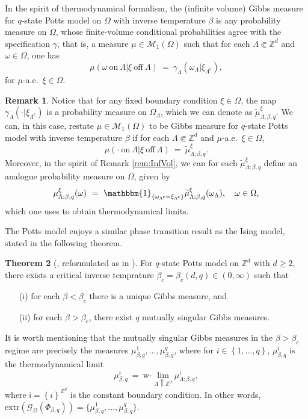 \documentclass[12pt]{article}
\newcommand{\G}{\mathcal{G}}
\newcommand{\M}{\mathcal{M}}
\newcommand{\Z}{\mathbb{Z}}
\newcommand{\set}[1]{\left\{#1\right\}}
\newcommand{\pika}{\boldsymbol{\cdot}}
\newcommand{\1}{\mathbbm{1}}
\renewcommand{\c}{\mathsf{c}}
\newcommand{\5}{\vspace{0.5cm}}
\renewcommand{\tilde}{\widetilde}
\theoremstyle{definition}
\newtheorem{thm}{Theorem}[section]
\newtheorem{rem}[thm]{Remark}
\begin{document}
In the spirit of thermodynamical formalism, the (infinite volume) Gibbs measure for $q$-state Potts model on $\Omega$ with inverse temperature $\beta$ is any probability measure on $\Omega$, whose finite-volume conditional probabilities agree with the specification $\gamma$, that is, a measure $\mu\in\M_1(\Omega)$ such that for each $\Lambda\Subset\Z^d$ and $\omega\in\Omega$, one has
$$\mu(\omega~\text{on}~\Lambda|\xi~\text{off}~\Lambda) ~=~ \gamma_\Lambda(\omega_\Lambda|\xi_{\Lambda^\c}),$$
for $\mu$-a.e.~$\xi\in\Omega$.

\begin{rem}
Notice that for any fixed boundary condition $\xi\in\Omega$, the map $\gamma_\Lambda(\pika|\xi_{\Lambda^\c})$ is a probability measure on $\Omega_\Lambda$, which we can denote as $\tilde{\mu}_{\Lambda;\beta,q}^\xi$. We can, in this case, restate $\mu\in\M_1(\Omega)$ to be Gibbs measure for $q$-state Potts model with inverse temperature $\beta$ if for each $\Lambda\Subset\Z^d$ and $\mu$-a.e.~$\xi\in\Omega$, 
$$\mu(\pika~\text{on}~\Lambda|\xi~\text{off}~\Lambda) ~=~ \tilde{\mu}_{\Lambda;\beta,q}^\xi.$$
Moreover, in the spirit of Remark \ref{rem:InfVol}, we can for each $\tilde{\mu}_{\Lambda;\beta,q}^\xi$ define an analogue probability measure on $\Omega$, given by
$$\mu_{\Lambda;\beta,q}^\xi(\omega) ~=~ \1_{\set{\omega_{\Lambda^\c}=\xi_{\Lambda^\c}}}\tilde{\mu}_{\Lambda;\beta,q}^\xi(\omega_\Lambda), \quad \omega\in\Omega,$$
which one uses to obtain thermodynamical limits.
\end{rem}

The Potts model enjoys a similar phase transition result as the Ising model,  stated in the following theorem.

\begin{thm}[\cite{ACCN}, reformulated as in \cite{GHM}]
For $q$-state Potts model on $\Z^d$ with $d\geq 2$, there exists a critical inverse temprature $\beta_c=\beta_c(d,q)\in(0,\infty)$ such that
\begin{itemize}
	\item[(i)] for each $\beta<\beta_c$ there is a unique Gibbs measure, and 
	\item[(ii)] for each $\beta>\beta_c$, there exist $q$ mutually singular Gibbs measures. 
\end{itemize}
\end{thm}

It is worth mentioning that the mutually singular Gibbs measures in the $\beta>\beta_c$ regime are precisely the measures $\mu_{\beta,q}^1,\ldots,\mu_{\beta,q}^q$, where for $i\in\set{1,\ldots,q}$, $\mu_{\beta,q}^i$ is the thermodynamical limit
$$\mu_{\beta,q}^i ~=~ \text{w-}\!\!\lim_{\Lambda\Uparrow\Z^d}\mu_{\Lambda;\beta,q}^{\mathsf{i}},$$
where $\mathsf{i}=\set{i}^{\Z^d}$ is the constant boundary condition. In other words, $\mathrm{extr}(\G_{\Omega}(\Phi_{\beta,q}))=\{\mu_{\beta,q}^1,\ldots,\mu_{\beta,q}^q\}$.
\end{document}
